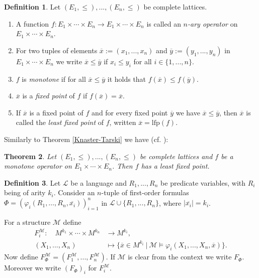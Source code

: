 \documentclass[acmsmall]{acmart}
\theoremstyle{plain}
\newtheorem{theorem}{Theorem}
\theoremstyle{definition}
\newtheorem{definition}[theorem]{Definition}
\newcommand{\calL}{\mathcal{L}}
\newcommand{\calM}{\mathcal{M}}
\newcommand{\mybar}[1]{\overline{#1}}
\newcommand{\impl}{\rightarrow} %
\newcommand{\lfp}{\mathrm{lfp}} %
\begin{document}
\begin{definition}
	Let $(E_1,\leq),...,(E_n,\leq)$ be complete lattices.
	\begin{enumerate}
		\item  A function  $f: E_1\times\cdots\times E_n \impl E_1\times\cdots\times E_n$ is called an \emph{$n$-ary operator} on $E_1\times\cdots\times E_n$.
		\item For two tuples of elements $\mybar{x} := (x_1,...,x_n)$ and $\mybar{y} :=(y_1,...,y_n)$ in $ E_1\times\cdots\times E_n$ we write $\mybar{x} \leq \mybar{y}$ if $x_i \leq y_i$ for all $i \in \{1,...,n\}$.
		\item $f$ is \emph{monotone} if for all $\mybar{x} \leq \mybar{y}$ it holds that $f(\mybar{x}) \leq f(\mybar{y})$.
		\item $\mybar{x}$ is a \emph{fixed point} of $f$ if $f(\mybar{x}) = \mybar{x}$.
		\item If $\mybar{x}$ is a fixed point of $f$ and for every fixed point $\mybar{y}$ we have $\mybar{x} \leq \mybar{y}$, then $\mybar{x}$ is called the \emph{least fixed point} of $f$, written $\mybar{x} = \lfp(f)$.
	\end{enumerate}
\end{definition}

Similarly to Theorem \ref{Knaster-Tarski} we have (cf. \cite{Arnold2001}):
\begin{theorem}
	Let $(E_1,\leq),...,(E_n,\leq)$ be complete lattices and $f$  be a monotone operator on $E_1\times\cdots\times E_n$. Then $f$ has a least fixed point.
\end{theorem}

\begin{definition}\label{def.SimFixedPointOperator}
	Let $\calL$ be a language and $R_1,...,R_n$ be predicate variables, with $R_i$ being of arity $k_i$. Consider an $n$-tuple of first-order formulas  $\Phi = (\varphi_i(R_1,\ldots,R_n,\mybar{x_i}))_{i=1}^n$ in  $\calL \cup \{R_1,...,R_n\}$, where $|\mybar{x_i}| = k_i$.
	
	
	For a structure $\calM$ define 
	\begin{align*}
		F_i^{\calM}:\quad  M^{k_1} \times \cdots \times M^{k_n} &\rightarrow M^{k_i},\\
		(X_1,...,X_n) &\mapsto \{\mybar{x} \in M^{k_i} ~|~ \calM \models \varphi_i(X_1,...,X_n,\mybar{x}) \}.
	\end{align*}
	Now define $F_{\Phi}^{\calM} = (F_1^{\calM},...,F_n^{\calM})$. If $\calM$ is clear from the context we write $F_{\Phi}$. Moreover we write $(F_{\Phi})_i$ for $F_i^{\calM}$.
\end{definition}
\end{document}
